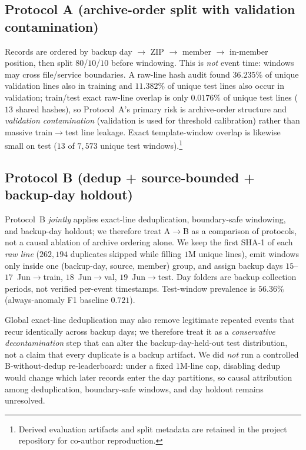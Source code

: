 \documentclass[a4paper]{llncs}
\begin{document}
\subsection{Protocol A (archive-order split with validation contamination)}
Records are ordered by backup day $\rightarrow$ ZIP $\rightarrow$ member $\rightarrow$ in-member position, then split $80$/$10$/$10$ before windowing. This is \emph{not} event time: windows may cross file/service boundaries. A raw-line hash audit found $36.235\%$ of unique validation lines also in training and $11.382\%$ of unique test lines also occur in validation; train/test exact raw-line overlap is only $0.0176\%$ of unique test lines ($13$ shared hashes), so Protocol~A's primary risk is archive-order structure and \emph{validation contamination} (validation is used for threshold calibration) rather than massive train$\rightarrow$test line leakage. Exact template-window overlap is likewise small on test ($13$ of $7{,}573$ unique test windows).\footnote{Derived evaluation artifacts and split metadata are retained in the project repository for co-author reproduction.}

\subsection{Protocol B (dedup + source-bounded + backup-day holdout)}
Protocol~B \emph{jointly} applies exact-line deduplication, boundary-safe windowing, and backup-day holdout; we therefore treat A$\rightarrow$B as a comparison of protocols, not a causal ablation of archive ordering alone. We keep the first SHA-1 of each \emph{raw line} ($262{,}194$ duplicates skipped while filling $1$M unique lines), emit windows only inside one (backup-day, source, member) group, and assign backup days $15$--$17$~Jun$\rightarrow$train, $18$~Jun$\rightarrow$val, $19$~Jun$\rightarrow$test. Day folders are backup collection periods, not verified per-event timestamps. Test-window prevalence is $56.36\%$ (always-anomaly F1 baseline $0.721$).

Global exact-line deduplication may also remove legitimate repeated events that recur identically across backup days; we therefore treat it as a \emph{conservative decontamination} step that can alter the backup-day-held-out test distribution, not a claim that every duplicate is a backup artifact. We did \emph{not} run a controlled B-without-dedup re-leaderboard: under a fixed $1$M-line cap, disabling dedup would change which later records enter the day partitions, so causal attribution among deduplication, boundary-safe windows, and day holdout remains unresolved.
\end{document}
